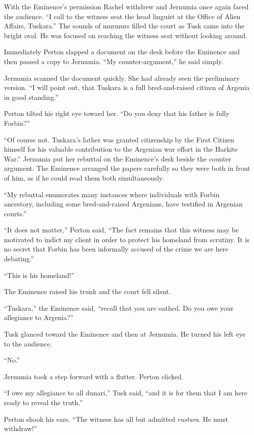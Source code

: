 With the Eminence's permission Rachel withdrew and Jernumia once again faced the audience. ``I
call to the witness seat the head linguist at the Office of Alien Affairs, Tuskara.'' The sounds
of murmurs filled the court as Tusk came into the bright oval. He was focused on reaching the
witness seat without looking around.

Immediately Perton slapped a document on the desk before the Eminence and then passed a copy to
Jernumia. ``My counter-argument,'' he said simply.

Jernumia scanned the document quickly. She had already seen the preliminary version. ``I will
point out, that Tuskara is a full bred-and-raised citizen of Argenia in good standing.''

Perton tilted his right eye toward her. ``Do you deny that his father is fully Forbin?''

``Of course not. Tuskara's father was granted citizenship by the First Citizen himself for his
valuable contribution to the Argenian war effort in the Harkite War.'' Jernumia put her rebuttal
on the Eminence's desk beside the counter argument. The Eminence arranged the papers carefully
so they were both in front of him, as if he could read them both simultaneously.

``My rebuttal enumerates many instances where individuals with Forbin ancestory, including some
bred-and-raised Argenians, have testified in Argenian courts.''

``It does not matter,'' Perton said, ``The fact remains that this witness may be motivated to
indict my client in order to protect his homeland from scrutiny. It is no secret that Forbin has
been informally accused of the crime we are here debating.''

``This is his homeland!''

The Eminence raised his trunk and the court fell silent.

``Tuskara,'' the Eminence said, ``recall that you are oathed. Do you owe your allegiance to
Argenia?''

Tusk glanced toward the Eminence and then at Jernumia. He turned his left eye to the audience.

``No.''

Jernumia took a step forward with a flutter. Perton clicked.

``I owe my allegiance to all dunari,'' Tusk said, ``and it is for them that I am here ready to
reveal the truth.''

Perton shook his ears. ``The witness has all but admitted \textit{rustara}. He must withdraw!''

